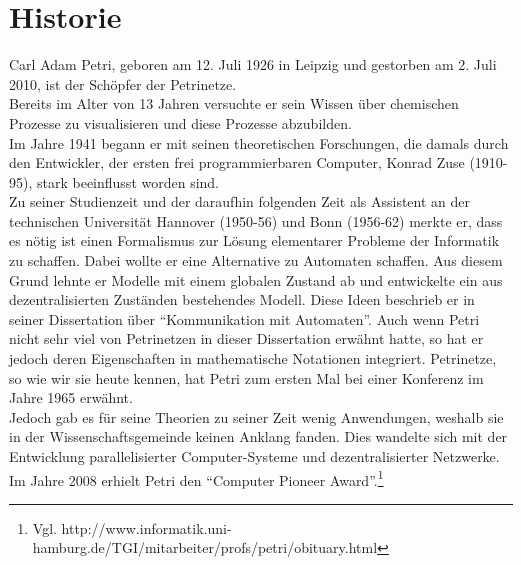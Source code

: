 \section{Historie}
Carl Adam Petri, geboren am 12. Juli 1926 in Leipzig und gestorben am 2. Juli 2010, ist der Schöpfer der Petrinetze. \\
Bereits im Alter von 13 Jahren versuchte er sein Wissen über chemischen Prozesse zu visualisieren und diese Prozesse abzubilden.\\
Im Jahre 1941 begann er mit seinen theoretischen Forschungen, die damals durch den Entwickler, der ersten frei programmierbaren Computer, Konrad Zuse (1910-95), stark beeinflusst worden sind.\\
Zu seiner Studienzeit und der daraufhin folgenden Zeit als Assistent an der technischen Universität Hannover (1950-56) und Bonn (1956-62) merkte er, dass es nötig ist einen Formalismus zur Lösung elementarer Probleme der Informatik zu schaffen.
Dabei wollte er eine Alternative zu Automaten schaffen.
Aus diesem Grund lehnte er Modelle mit einem globalen Zustand ab und entwickelte ein aus dezentralisierten Zuständen bestehendes Modell.
Diese Ideen beschrieb er in seiner Dissertation über \enquote{Kommunikation mit Automaten}.
Auch wenn Petri nicht sehr viel von Petrinetzen in dieser Dissertation erwähnt hatte, so hat er jedoch deren Eigenschaften in mathematische Notationen integriert.
Petrinetze, so wie wir sie heute kennen, hat Petri zum ersten Mal bei einer Konferenz im Jahre 1965 erwähnt. \\ Jedoch gab es für seine Theorien zu seiner Zeit wenig Anwendungen, weshalb sie in der Wissenschaftsgemeinde keinen Anklang fanden. Dies wandelte sich mit der Entwicklung parallelisierter Computer-Systeme und dezentralisierter Netzwerke. Im Jahre 2008 erhielt Petri den \enquote{Computer Pioneer Award}.\footnote{Vgl. http://www.informatik.uni-hamburg.de/TGI/mitarbeiter/profs/petri/obituary.html}

